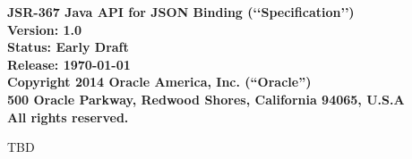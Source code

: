 \begin{flushleft}

{\bfseries JSR-367 Java API for JSON Binding (\lq\lq Specification\rq\rq)\\
Version: 1.0 \\
Status: Early Draft \\
Release: \today\\ 
Copyright 2014 Oracle America, Inc. (``Oracle'') \\
500 Oracle Parkway, Redwood Shores, California 94065, U.S.A\\ 
All rights reserved.
}

TBD

\end{flushleft}
